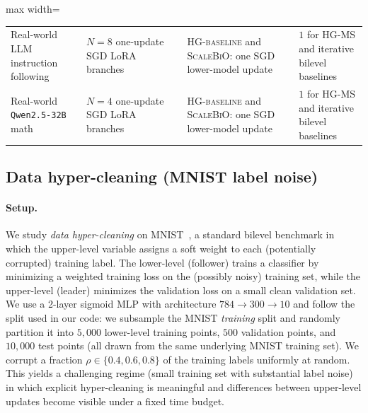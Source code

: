 \documentclass{article}
\theoremstyle{normaltheorem}
\begin{document}
\begin{table}[t]
\begin{adjustbox}{max width=\linewidth}
\begin{tabular}{p{0.21\linewidth}p{0.29\linewidth}p{0.31\linewidth}p{0.19\linewidth}}
    \addlinespace
    Real-world LLM instruction following
    & \(N=8\) one-update SGD LoRA branches
    & \textsc{HG-baseline} and \textsc{ScaleBiO}: one SGD lower-model update
    & \(1\) for \textsc{HG-MS} and iterative bilevel baselines \\
    \addlinespace
    Real-world \texttt{Qwen2.5-32B} math
    & \(N=4\) one-update SGD LoRA branches
    & \textsc{HG-baseline} and \textsc{ScaleBiO}: one SGD lower-model update
    & \(1\) for \textsc{HG-MS} and iterative bilevel baselines \\
    \bottomrule
  \end{tabular}
  \end{adjustbox}
\end{table}

\subsection{Data hyper-cleaning (MNIST label noise)}\label{subsec:dhc}
\paragraph{Setup.}
We study \emph{data hyper-cleaning} on MNIST~\citep{lecun1998mnist}, a standard bilevel benchmark in which the upper-level variable assigns a
soft weight to each (potentially corrupted) training label.
The lower-level (follower) trains a classifier by minimizing a weighted training loss on the (possibly noisy) training
set, while the upper-level (leader) minimizes the validation loss on a small clean validation set.
We use a 2-layer sigmoid MLP with architecture \(784\to300\to10\) and follow the split used in our code: we subsample the MNIST \emph{training}
split and randomly partition it into $5{,}000$ lower-level training points, $500$ validation points, and $10{,}000$ test
points (all drawn from the same underlying MNIST training set).
We corrupt a fraction $\rho\in\{0.4,0.6,0.8\}$ of the training labels uniformly at random.
This yields a challenging regime (small training set with substantial label noise) in which explicit hyper-cleaning is
meaningful and differences between upper-level updates become visible under a fixed time budget.
\end{document}
